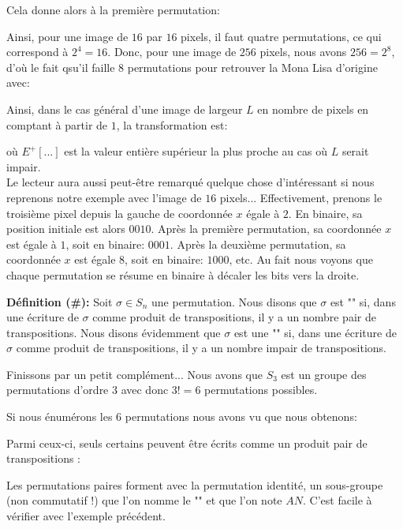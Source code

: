 	\pagebreak
	\begin{tcolorbox}[colframe=black,colback=white,sharp corners]
	Cela donne alors à la première permutation:
	
	Ainsi, pour une image de $16$ par $16$ pixels, il faut quatre permutations, ce qui correspond à $2^4=16$. Donc, pour une image de $256$ pixels, nous avons $256=2^8$, d'où le fait qsu'il faille $8$ permutations pour retrouver la Mona Lisa d'origine avec:
	
	Ainsi, dans le cas général d'une image de largeur $L$ en nombre de pixels en comptant à partir de $1$, la transformation est:
	
	où $E^+[...]$ est la valeur entière supérieur la plus proche au cas où $L$ serait impair.\\
	
	Le lecteur aura aussi peut-être remarqué quelque chose d'intéressant si nous reprenons notre exemple avec l'image de $16$ pixels... Effectivement, prenons le troisième pixel depuis la gauche de coordonnée $x$ égale à $2$. En binaire, sa position initiale est alors $0010$. Après la première permutation, sa coordonnée $x$ est égale à $1$, soit en binaire: $0001$. Après la deuxième permutation, sa coordonnée $x$ est égale $8$, soit en binaire: $1000$, etc. Au fait nous voyons que chaque permutation se résume en binaire à décaler les bits vers la droite.
	\end{tcolorbox}
	\textbf{Définition (\#\mydef):} Soit $\sigma \in S_n$ une permutation. Nous disons que $\sigma$ est "" si, dans une écriture de $\sigma$ comme produit de transpositions, il y a un nombre pair de transpositions. Nous disons évidemment que $\sigma$ est une "" si, dans une écriture de $\sigma$ comme produit de transpositions, il y a un nombre impair de transpositions.
	
	Finissons par un petit complément... Nous avons que $S_3$ est un groupe des permutations d'ordre $3$ avec donc $3!=6$ permutations possibles.
	
	Si nous énumérons les $6$ permutations nous avons vu que nous obtenons:
	
	Parmi ceux-ci, seuls certains peuvent être écrits comme un produit pair de transpositions :
	
	Les permutations paires forment avec la permutation identité, un sous-groupe (non commutatif !) que l'on nomme le "" et que l'on note $AN $. C'est facile à vérifier avec l'exemple précédent.
		
